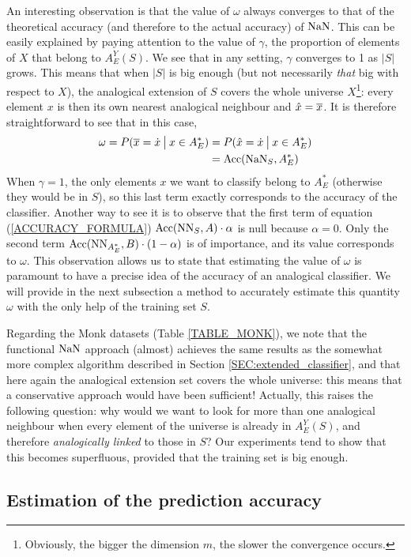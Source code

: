 An interesting observation is that the value of $\omega$ always converges to
that of the theoretical accuracy (and therefore to the actual accuracy) of
$\NaN$. This can be easily explained by paying attention to the value of
$\gamma$, the proportion of elements of $X$ that belong to $A_E^Y(S)$. We see
that in any setting, $\gamma$ converges to 1 as $|S|$ grows. This means that
when $|S|$ is big enough (but not necessarily \textit{that} big with respect to $X$), the
analogical extension of $S$ covers the whole universe $X$\footnote{Obviously,
the bigger the dimension $m$, the slower the convergence occurs.}: every
element $x$ is then its own nearest analogical neighbour and $\hat{x} =
\albl{x}$. It is therefore straightforward to see that in this case,
\begin{align*}
  \omega = P(\albl{x} = \dot{x} \given[\big] x \in A_E^*) &= P(\hat{x}
  = \dot{x} \given[\big] x \in A_E^*)\\
&= \acc(\NaN_S, A_E^*)
\end{align*}
When $\gamma = 1$, the only elements $x$ we want to classify belong to $A_E^*$
(otherwise they would be in $S$), so this last term exactly corresponds to the
accuracy of the classifier. Another way to see it is to observe that the first
term of equation (\ref{ACCURACY_FORMULA}) $\acc(\NN_{S}, A) \cdot \alpha$ is null
because $\alpha = 0$. Only the second term $\acc(\NN_{A_E^*}, B) \cdot (1 -
\alpha)$ is of importance, and its value corresponds to $\omega$. This
observation allows us to state that estimating the value of $\omega$ is
paramount to have a precise idea of the accuracy of an analogical classifier.
We will provide in the next subsection a method to accurately estimate this
quantity $\omega$ with the only help of the training set $S$.

Regarding the Monk datasets (Table \ref{TABLE_MONK}), we note that the
functional $\NaN$ approach (almost) achieves the same results as the somewhat
more complex algorithm described in Section \ref{SEC:extended_classifier}, and that
here again the analogical extension set covers the whole universe: this means
that a conservative approach would have been sufficient! Actually, this raises
the following question: why would we want to look for more than one analogical
neighbour when every element of the universe is already in $A_E^Y(S)$, and
therefore \textit{analogically linked} to those in $S$? Our experiments tend to
show that this becomes superfluous, provided that the training set is big
enough.

\subsection{Estimation of the prediction accuracy}

